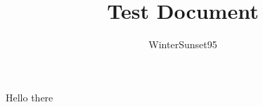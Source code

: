 \usepackage{amsmath}
\usepackage{amsthm}
\usepackage{amsfont}
\usepackage{amssymb}
\title{Test Document}
\author{WinterSunset95}
\theoremstyle{definition}
\newtheorem{exercise}{Ex.}


\maketitle
Hello there


